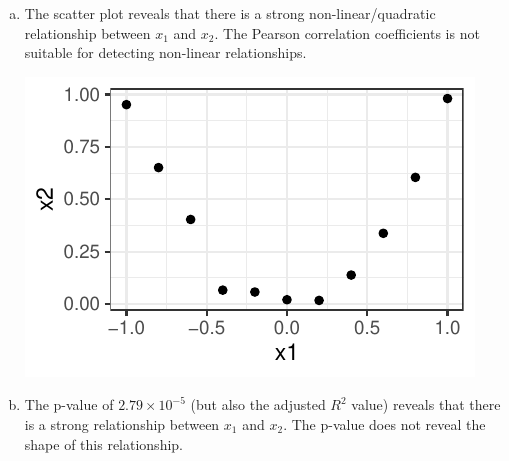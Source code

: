 {\begin{enumerate}[a)]
  The Pearson correlation coefficient is close to 0 $\Rightarrow$ there is no \textbf{linear} relationship between $x_1$ and $x_2$.
  
  \item  The scatter plot reveals that there is a strong non-linear/quadratic relationship between $x_1$ and $x_2$. The Pearson correlation coefficients is not suitable
  for detecting non-linear relationships.
  
\begin{center}
\includegraphics[width=\maxwidth]{figure/add_Points_x1_x2_sol.pdf}
\end{center}
 
  \item The p-value of $2.79 \times 10^{-5}$ (but also the adjusted $R^2$ value) reveals that there is a strong relationship between $x_1$ and $x_2$.
  The p-value does not reveal the shape of this relationship.
  
\end{enumerate}
}
